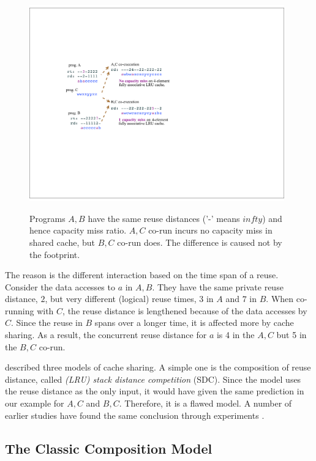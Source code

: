 \begin{figure}[t!]
\centering
\includegraphics[width=11cm]{figures/intro/rdft_comp}
\label{intro_rdft_comp}
\caption{Programs $A,B$ have the same reuse distances ('-' means $infty$) and hence capacity miss
  ratio. $A,C$ co-run incurs no capacity miss in shared cache, but
  $B,C$ co-run does.  The difference is caused not by the footprint.}
\end{figure}

The reason is the different interaction based on the time span of 
a reuse.  Consider the data accesses to $a$ in $A,B$.  They
have the same private reuse distance, $2$, but very different
(logical) reuse times, $3$ in $A$ and $7$ in $B$.  When co-running with
$C$, the reuse distance is lengthened because of the data accesses by
$C$.  Since the reuse in $B$ spans over a longer time, it is affected
more by cache sharing.  As a result, the concurrent reuse distance for
$a$ is 4 in the $A,C$ but 5 in the $B,C$ co-run.

\citet{Chandra+:HPCA05} described three models of cache sharing.  A
simple one is the composition of reuse distance, called \emph{ (LRU)
  stack distance competition} (SDC).  Since the model uses the reuse
distance as the only input, it would have given the same prediction in
our example for $A,C$ and $B,C$.  Therefore, it is a flawed model.  A
number of earlier studies have found the same conclusion through
experiments \citep{Fedorova+:CACM10,Zhuravlev+:ASPLOS10,Blagodurov+:TOCS10}.

\subsection{The Classic Composition Model}
\label{sec:back:classic}

